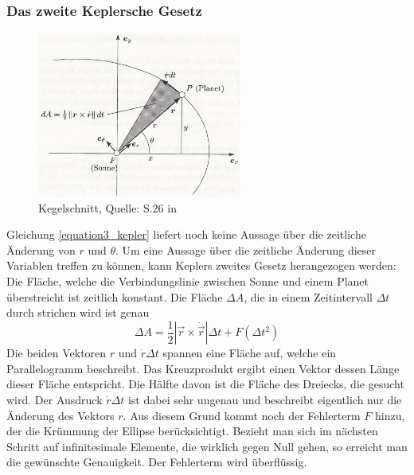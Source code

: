 \subsubsection{Das zweite Keplersche Gesetz}
\begin{figure}[h]                                                                           %
	\centering                                                                            	%
	\includegraphics[width=0.6\textwidth]{./images/keplers_law2.jpg}                        %
	\caption[Kegelschnitt]{Kegelschnitt, Quelle: S.26 in \cite{Raumflugm}}                  %
	\label{fig:kegelsch_2}                                                                  %
\end{figure}                                                                              	%
Gleichung \ref{equation3_kepler} liefert noch keine Aussage über die zeitliche Änderung von \ensuremath{r} und \ensuremath{\theta}. Um eine Aussage über die zeitliche Änderung dieser Variablen treffen zu können, kann Keplers zweites Gesetz herangezogen werden: Die Fläche, welche die Verbindungslinie zwischen Sonne und einem Planet überstreicht ist zeitlich konstant. Die Fläche \ensuremath{\Delta A}, die in einem Zeitintervall \ensuremath{\Delta t} durch strichen wird ist genau
\begin{equation}
	\Delta A = \frac{1}{2}\left| \vec{r} \times \dot{\vec{r}} \right|\Delta t + F(\Delta t^2)
\end{equation}   
Die beiden Vektoren \ensuremath{r} und \ensuremath{\dot{r} \Delta t} spannen eine Fläche auf, welche ein Parallelogramm beschreibt. Das Kreuzprodukt ergibt einen Vektor dessen Länge dieser Fläche entspricht. Die Hälfte davon ist die Fläche des Dreiecks, die gesucht wird. Der Ausdruck \ensuremath{\dot{r} \Delta t} ist dabei sehr ungenau und beschreibt eigentlich nur die Änderung des Vektors \ensuremath{r}. Aus diesem Grund kommt noch der Fehlerterm \ensuremath{F} hinzu, der die Krümmung der Ellipse berücksichtigt. Bezieht man sich im nächsten Schritt auf infinitesimale Elemente, die wirklich gegen Null gehen, so erreicht man die gewünschte Genauigkeit. Der Fehlerterm wird überflüssig.  
